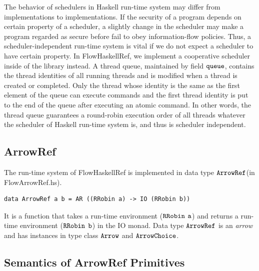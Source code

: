 \documentclass[a4paper]{report}
\newcommand{\co}[1]{$\cod{#1}$}
\begin{document}
The behavior of schedulers in Haskell run-time system may differ from implementations to implementations. 
If the security of a program depends on certain property of a scheduler, a slightly change in the
scheduler may make a program regarded as secure before fail to obey information-flow policies.
Thus, a scheduler-independent run-time system is vital if we do not expect a scheduler to have certain property.
In FlowHaskellRef, we implement a cooperative scheduler inside of the library instead.
A thread queue, maintained by field \co{queue}, contains the thread identities of all running threads and 
is modified when a thread is created or completed.
Only the thread whose identity is the same as the first element of the queue
can execute commands and the first thread identity is put to the end of the queue after executing an atomic command.
In other words, the thread queue guarantees a round-robin execution order of all threads whatever
the scheduler of Haskell run-time system is, and thus is scheduler independent.


\subsection{ArrowRef}
The run-time system of FlowHaskellRef is implemented in data type \co{ArrowRef}(in FlowArrowRef.hs). 
\begin{Verbatim}[fontsize=\footnotesize]
data ArrowRef a b = AR ((RRobin a) -> IO (RRobin b))
\end{Verbatim}
It is a function that takes a run-time environment (\co{RRobin} \co{a}) and returns a run-time environment
(\co{RRobin} \co{b}) in the IO monad. Data type \co{ArrowRef} is an {\em arrow} and has instances in
type class \co{Arrow} and \co{ArrowChoice}.

\subsection{Semantics of ArrowRef Primitives}
\end{document}
